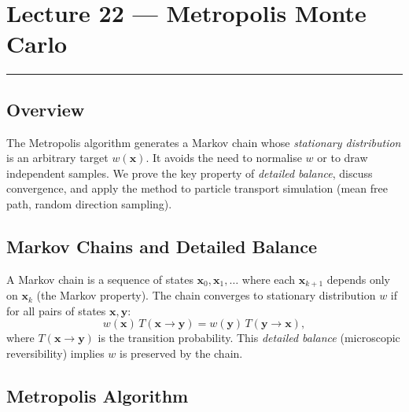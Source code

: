 
\section{Lecture 22 — Metropolis Monte Carlo}\label{sec:lec22}
\hrule\vspace{1.5em}

\subsection*{Overview}
The Metropolis algorithm generates a Markov chain whose
\emph{stationary distribution} is an arbitrary target
$w(\mathbf{x})$.  It avoids the need to normalise $w$ or to
draw independent samples.  We prove the key property of
\emph{detailed balance}, discuss convergence, and apply the
method to particle transport simulation (mean free path,
random direction sampling).

\subsection{Markov Chains and Detailed Balance}\label{subsec:lec22:db}

A Markov chain is a sequence of states $\mathbf{x}_0,\mathbf{x}_1,\ldots$
where each $\mathbf{x}_{k+1}$ depends only on $\mathbf{x}_k$
(the Markov property).  The chain converges to stationary
distribution $w$ if for all pairs of states $\mathbf{x},\mathbf{y}$:
\begin{equation}
  w(\mathbf{x})\,T(\mathbf{x}\to\mathbf{y})
  = w(\mathbf{y})\,T(\mathbf{y}\to\mathbf{x}),
  \label{eq:lec22:detailed_balance}
\end{equation}
where $T(\mathbf{x}\to\mathbf{y})$ is the transition probability.
This \emph{detailed balance} (microscopic reversibility) implies
$w$ is preserved by the chain.

\subsection{Metropolis Algorithm}\label{subsec:lec22:metro}


